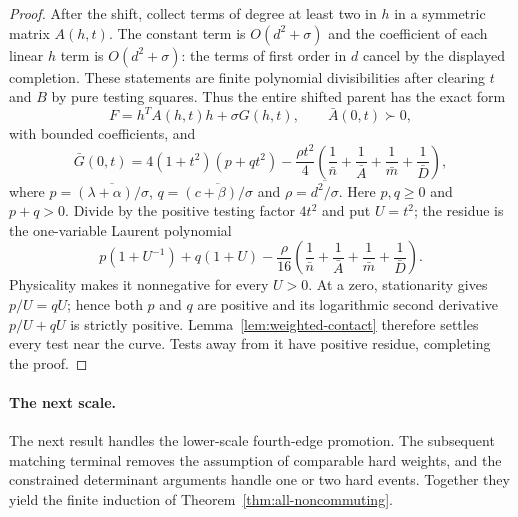 \begin{proof}
After the shift, collect terms of degree at least two in $h$ in a symmetric matrix $A(h,t)$. The constant term is $O(d^2+\sigma)$ and the coefficient of each linear $h$ term is $O(d^2+\sigma)$: the terms of first order in $d$ cancel by the displayed completion. These statements are finite polynomial divisibilities after clearing $t$ and $B$ by pure testing squares. Thus the entire shifted parent has the exact form
\[
F=h^TA(h,t)h+\sigma G(h,t),\qquad
\bar A(0,t)\succ0,
\]
with bounded coefficients, and
\[
\bar G(0,t)=4(1+t^2)(p+qt^2)
 -\frac{\rho t^2}{4}\left(\frac1{\bar n}+\frac1{\bar A}+\frac1{\bar m}+\frac1{\bar D}\right),
\]
where $p=\overline{(\lambda+\alpha)/\sigma}$,
$q=\overline{(c+\beta)/\sigma}$ and $\rho=\overline{d^2/\sigma}$.
Here $p,q\ge0$ and $p+q>0$. Divide by the positive testing factor $4t^2$ and put $U=t^2$; the residue is the one-variable Laurent polynomial
\[
p(1+U^{-1})+q(1+U)
 -\frac\rho{16}\left(\frac1{\bar n}+\frac1{\bar A}+\frac1{\bar m}+\frac1{\bar D}\right).
\]
Physicality makes it nonnegative for every $U>0$. At a zero, stationarity gives $p/U=qU$; hence both $p$ and $q$ are positive and its logarithmic second derivative $p/U+qU$ is strictly positive. Lemma~\ref{lem:weighted-contact} therefore settles every test near the curve. Tests away from it have positive residue, completing the proof.
\end{proof}

\paragraph{The next scale.}
The next result handles the lower-scale fourth-edge promotion. The subsequent matching terminal removes the assumption of comparable hard weights, and the constrained determinant arguments handle one or two hard events. Together they yield the finite induction of Theorem~\ref{thm:all-noncommuting}.
